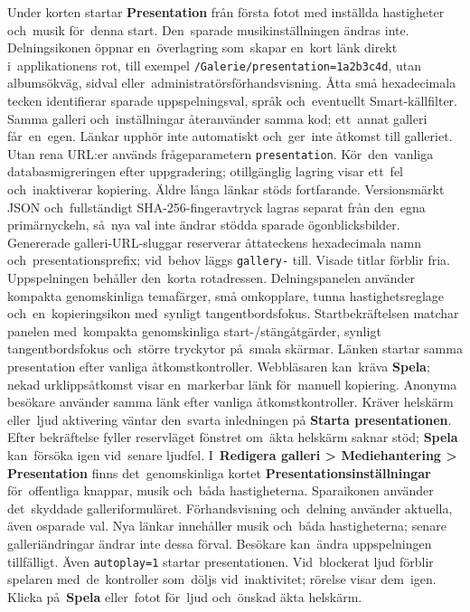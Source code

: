 \documentclass[11pt,a4paper]{article}
\newcommand{\ui}[1]{\textbf{#1}}
\newcommand{\codeword}[1]{\nolinkurl{#1}}
\begin{document}
Under korten startar \ui{Presentation} från första fotot med
inställda hastigheter och~musik för~denna start. Den~sparade musikinställningen
ändras inte. Delningsikonen öppnar en~överlagring som~skapar en~kort länk direkt
i~applikationens rot, till exempel \codeword{/Galerie/presentation=1a2b3c4d},
utan albumsökväg, sidval eller~administratörsförhandsvisning.
Åtta små hexadecimala tecken identifierar sparade uppspelningsval, språk
och~eventuellt Smart-källfilter. Samma galleri och~inställningar återanvänder
samma kod; ett~annat galleri får~en~egen. Länkar upphör inte automatiskt
och~ger~inte åtkomst till galleriet. Utan rena URL:er används frågeparametern
\codeword{presentation}. Kör~den~vanliga databasmigreringen efter uppgradering;
otillgänglig lagring visar ett~fel och~inaktiverar kopiering.
Äldre långa länkar stöds fortfarande. Versionsmärkt JSON och~fullständigt
SHA-256-fingeravtryck lagras separat från den~egna primärnyckeln, så~nya val
inte ändrar stödda sparade ögonblicksbilder.
Genererade galleri-URL-sluggar reserverar åttateckens hexadecimala namn
och~presentationsprefix; vid~behov läggs \codeword{gallery-} till.
Visade titlar förblir fria. Uppspelningen behåller den~korta rotadressen.
Delningspanelen använder kompakta genomskinliga temafärger, små omkopplare,
tunna hastighetsreglage och~en~kopieringsikon med~synligt tangentbordsfokus.
Startbekräftelsen matchar panelen med~kompakta genomskinliga
start-/stängåtgärder,
synligt tangentbordsfokus och~större tryckytor på~smala skärmar.
Länken startar samma presentation efter vanliga åtkomstkontroller.
Webbläsaren kan~kräva \ui{Spela}; nekad urklippsåtkomst visar
en~markerbar länk för~manuell kopiering.
Anonyma besökare använder samma länk efter vanliga åtkomstkontroller.
Kräver helskärm eller~ljud aktivering väntar den~svarta inledningen på
\ui{Starta presentationen}. Efter bekräftelse fyller reservläget fönstret
om~äkta helskärm saknar stöd; \ui{Spela} kan~försöka igen vid~senare ljudfel.
I~\ui{Redigera galleri > Mediehantering > Presentation} finns det~genomskinliga
kortet \ui{Presentationsinställningar} för~offentliga knappar, musik och~båda
hastigheterna. Sparaikonen använder det~skyddade galleriformuläret.
Förhandsvisning och~delning använder aktuella, även osparade val. Nya länkar
innehåller musik och~båda hastigheterna; senare galleriändringar ändrar inte
dessa förval. Besökare kan~ändra uppspelningen tillfälligt.
Även \codeword{autoplay=1} startar presentationen. Vid~blockerat ljud förblir
spelaren med~de~kontroller som~döljs vid~inaktivitet; rörelse visar dem~igen.
Klicka på~\ui{Spela} eller~fotot för~ljud och~önskad äkta helskärm.
\end{document}
